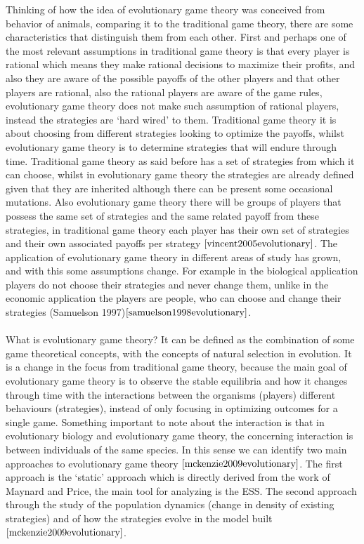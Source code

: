 \documentclass{book}
\begin{document}
Thinking of how the idea of evolutionary game theory was conceived from behavior of animals, comparing it to the traditional game theory, there are some characteristics that distinguish them from each other. First and perhaps one of the most relevant assumptions in traditional game theory is that every player is rational which means they make rational decisions to maximize their profits, and also they are aware of the possible payoffs of the other players and that other players are rational, also the rational players are aware of the game rules, evolutionary game theory does not make such assumption of rational players, instead the strategies are ‘hard wired’ to them.  Traditional game theory it is about choosing from different strategies looking to optimize the payoffs, whilst evolutionary game theory is to determine strategies that will endure through time. Traditional game theory as said before has a set of strategies from which it can choose, whilst in evolutionary game theory the strategies are already defined given that they are inherited although there can be present some occasional mutations. Also evolutionary game theory there will be groups of players that possess the same set of strategies and the same related payoff from these strategies, in traditional game theory each player has their own set of strategies and their own associated payoffs per strategy $\cite{vincent2005evolutionary}$.  The application of evolutionary game theory in different areas of study has grown, and with this some assumptions change. For example in the biological application players do not choose their strategies and never change them, unlike in the economic application the players are people, who can choose and change their strategies (Samuelson 1997)$\cite{samuelson1998evolutionary}$.
\\\\What is evolutionary game theory?
It can be defined as the combination of some game theoretical concepts, with the concepts of natural selection in evolution. It is a change in the focus from traditional game theory, because the main goal of evolutionary game theory is to observe the stable equilibria and how it changes through time with the interactions between the organisms (players) different behaviours (strategies), instead of only focusing in optimizing outcomes for a single game. Something important to note about the interaction is that in evolutionary biology and evolutionary game theory, the concerning interaction is between individuals of the same species. In this sense we can identify two main approaches to evolutionary game theory $\cite{mckenzie2009evolutionary}$. The first approach is the ‘static’ approach which is directly derived from the work of Maynard and Price, the main tool for analyzing is the ESS. The second approach through the study of the population dynamics (change in density of existing strategies) and of how the strategies evolve in the model built $\cite{mckenzie2009evolutionary}$.
\end{document}
